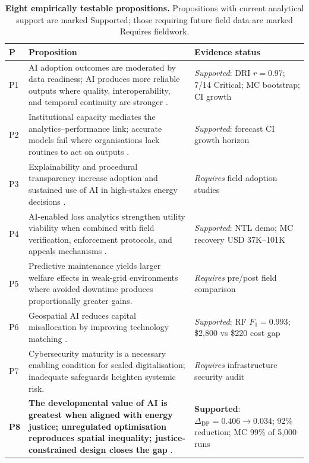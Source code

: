 \documentclass[preprint,12pt]{elsarticle}
\newcommand{\ThP}[1]{\cellcolor{hdrpurple}\color{white}\bfseries\small #1}
\begin{document}
\begin{table}[H]
\centering
\caption{\textbf{Eight empirically testable propositions.}
Propositions with current analytical support are marked
Supported; those requiring future field data are marked
Requires fieldwork.}
\label{tab:props}
\setlength\extrarowheight{3pt}
\begin{tabularx}{\textwidth}{|>{\centering\arraybackslash}p{0.6cm}
                              |>{\arraybackslash}X
                              |>{\arraybackslash}p{3.6cm}|}
\hline
\ThP{P} & \ThP{Proposition} & \ThP{Evidence status} \\
\hline
\rowcolor{rowA}
P1 & AI adoption outcomes are moderated by data readiness;
     AI produces more reliable outputs where quality,
     interoperability, and temporal continuity are
     stronger \cite{Ahmad2021, Kitchin2014}. &
  \textit{Supported}: DRI $r=0.97$; 7/14 Critical;
  MC bootstrap; CI growth \\
\hline
P2 & Institutional capacity mediates the analytics--performance
     link; accurate models fail where organisations
     lack routines to act on outputs \cite{Danish2023}. &
  \textit{Supported}: forecast CI growth horizon \\
\hline
\rowcolor{rowA}
P3 & Explainability and procedural transparency increase
     adoption and sustained use of AI in high-stakes
     energy decisions \cite{Machlev2022}. &
  \textit{Requires} field adoption studies \\
\hline
P4 & AI-enabled loss analytics strengthen utility viability
     when combined with field verification, enforcement
     protocols, and appeals mechanisms
     \cite{Chatterjee2022}. &
  \textit{Supported}: NTL demo;
  MC recovery USD 37K--101K \\
\hline
\rowcolor{rowA}
P5 & Predictive maintenance yields larger welfare effects
     in weak-grid environments where avoided downtime
     produces proportionally greater gains. &
  \textit{Requires} pre/post field comparison \\
\hline
P6 & Geospatial AI reduces capital misallocation by improving
     technology matching \cite{Korkovelos2019, Arevalo2024}. &
  \textit{Supported}: RF $F_1=0.993$;
  \$2,800 vs \$220 cost gap \\
\hline
\rowcolor{rowA}
P7 & Cybersecurity maturity is a necessary enabling condition
     for scaled digitalisation; inadequate safeguards
     heighten systemic risk. &
  \textit{Requires} infrastructure security audit \\
\hline
\rowcolor{rowD}
\textbf{P8} &
  \textbf{The developmental value of AI is greatest when
  aligned with energy justice; unregulated optimisation
  reproduces spatial inequality; justice-constrained
  design closes the gap}
  \cite{Sovacool2015, Barocas2019}. &
  \textbf{Supported}: $\Delta_{\mathrm{DP}}=0.406\to0.034$;
  92\% reduction; MC 99\% of 5,000 runs \\
\hline
\end{tabularx}
\end{table}
\end{document}
